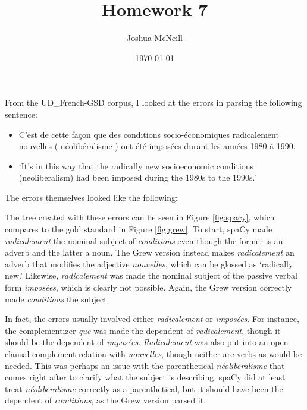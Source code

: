 \documentclass{article}
\title{Homework 7}
\author{Joshua McNeill}
\date{\today}
\newcommand{\lexi}[1]{\textit{#1}}
\begin{document}
  \maketitle
  From the UD\_French-GSD corpus, I looked at the errors in parsing the following sentence:
  \begin{itemize}
    \item[] C'est de cette façon que des conditions socio-économiques radicalement nouvelles ( néolibéralisme ) ont été imposées durant les années 1980 à 1990. \\
    \item[] `It's in this way that the radically new socioeconomic conditions (neoliberalism) had been imposed during the 1980s to the 1990s.'
  \end{itemize}
  The errors themselves looked like the following:
  
  The tree created with these errors can be seen in Figure \ref{fig:spacy}, which compares to the gold standard in Figure \ref{fig:grew}.
  To start, spaCy made \lexi{radicalement} the nominal subject of \lexi{conditions} even though the former is an adverb and the latter a noun.
  The Grew version instead makes \lexi{radicalement} an adverb that modifies the adjective \lexi{nouvelles}, which can be glossed as `radically new.'
  Likewise, \lexi{radicalement} was made the nominal subject of the passive verbal form \lexi{imposées}, which is clearly not possible.
  Again, the Grew version correctly made \lexi{conditions} the subject.

  In fact, the errors usually involved either \lexi{radicalement} or \lexi{imposées}.
  For instance, the complementizer \lexi{que} was made the dependent of \lexi{radicalement}, though it should be the dependent of \lexi{imposées}.
  \lexi{Radicalement} was also put into an open clausal complement relation with \lexi{nouvelles}, though neither are verbs as would be needed.
  This was perhaps an issue with the parenthetical \lexi{néoliberalisme} that comes right after to clarify what the subject is describing.
  spaCy did at least treat \lexi{néoliberalisme} correctly as a parenthetical, but it should have been the dependent of \lexi{conditions}, as the Grew version parsed it.
\end{document}
